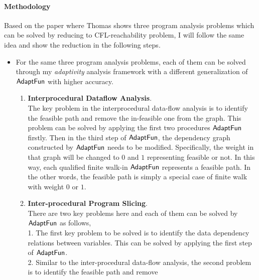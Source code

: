 \paragraph{Methodology}
\label{sec:cfl-methodology}
Based on the paper\cite{Reps98} where Thomas shows 
three program analysis problems 
which can be solved by reducing to CFL-reachability problem, I will follow the same idea and show the reduction
in the following steps.
\begin{itemize}
 \item For the same three program analysis problems, each of them 
 can be solved through my \emph{adaptivity} analysis framework with 
 a different generalization of $\textsf{AdaptFun}$ with higher accuracy.
 \begin{enumerate}
    \item \textbf{Interprocedural Dataflow Analysis}.
    \\
The key problem in the interprocedural data-flow analysis is to identify the feasible path and remove 
the in-feasible one from the graph.
This problem can be solved by applying the first two procedures $\textsf{AdaptFun}$ firstly.
Then in the third step of  $\textsf{AdaptFun}$, the dependency graph constructed by $\textsf{AdaptFun}$ needs to be modified.
Specifically, the weight in that graph will be changed to $0$ and $1$ 
representing feasible or not. 
In this way, each qualified finite walk-in 
$\textsf{AdaptFun}$ represents a feasible path.
In the other words, the feasible path is simply a special case of finite walk 
with weight $0$ or $1$.
\item \textbf{Inter-procedural Program Slicing}.
\\
There are two key problems here and each of them can be solved by $\textsf{AdaptFun}$ as follows,
\\ 
1. The first key problem to be solved is to identify the data dependency relations between variables. 
This can be solved by applying the first step of $\textsf{AdaptFun}$.
\\
2. Similar to the inter-procedural data-flow analysis, 
the second problem is to identify the feasible path and remove 

\end{enumerate}
\end{itemize}
